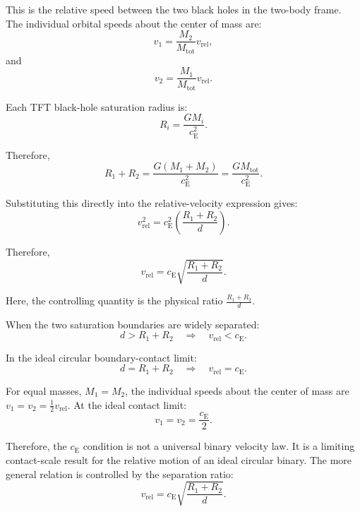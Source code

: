 This is the relative speed between the two black holes in the two-body frame. The individual orbital speeds about the center of mass are:
\begin{equation}
    v_1 = \frac{M_2}{M_{\mathrm{tot}}}v_{\mathrm{rel}},
\end{equation}
and
\begin{equation}
    v_2 = \frac{M_1}{M_{\mathrm{tot}}}v_{\mathrm{rel}}.
\end{equation}

Each TFT black-hole saturation radius is:
\begin{equation}
    R_i = \frac{G M_i}{c_{\mathrm{E}}^2}.
\end{equation}

Therefore,
\begin{equation}
    R_1 + R_2 = \frac{G(M_1+M_2)}{c_{\mathrm{E}}^2} = \frac{G M_{\mathrm{tot}}}{c_{\mathrm{E}}^2}.
\end{equation}

Substituting this directly into the relative-velocity expression gives:
\begin{equation}
    v_{\mathrm{rel}}^2 = c_{\mathrm{E}}^2 \left( \frac{R_1+R_2}{d} \right).
\end{equation}

Therefore,
\begin{equation}
    v_{\mathrm{rel}} = c_{\mathrm{E}} \sqrt{\frac{R_1+R_2}{d}}.
\end{equation}

Here, the controlling quantity is the physical ratio $\frac{R_1+R_2}{d}$.

When the two saturation boundaries are widely separated:
\begin{equation}
    d > R_1 + R_2 \quad \Longrightarrow \quad v_{\mathrm{rel}} < c_{\mathrm{E}}.
\end{equation}

In the ideal circular boundary-contact limit:
\begin{equation}
    d = R_1 + R_2 \quad \Longrightarrow \quad v_{\mathrm{rel}} = c_{\mathrm{E}}.
\end{equation}

For equal masses, $M_1 = M_2$, the individual speeds about the center of mass are $v_1 = v_2 = \frac{1}{2}v_{\mathrm{rel}}$. At the ideal contact limit:
\begin{equation}
    v_1 = v_2 = \frac{c_{\mathrm{E}}}{2}.
\end{equation}

Therefore, the $c_{\mathrm{E}}$ condition is not a universal binary velocity law. It is a limiting contact-scale result for the relative motion of an ideal circular binary. The more general relation is controlled by the separation ratio:
\begin{equation}
    v_{\mathrm{rel}} = c_{\mathrm{E}} \sqrt{\frac{R_1+R_2}{d}}.
\end{equation}

